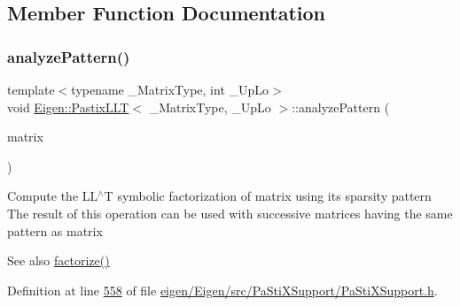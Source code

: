 \subsection{Member Function Documentation}
\mbox{\label{class_eigen_1_1_pastix_l_l_t_a671e8444ae2f04db3565e35caa958667}} 
\subsubsection{\texorpdfstring{analyze\+Pattern()}{analyzePattern()}\hspace{0.1cm}{\footnotesize\ttfamily [1/2]}}
{\footnotesize\ttfamily template$<$typename \+\_\+\+Matrix\+Type, int \+\_\+\+Up\+Lo$>$ \\
void \hyperlink{class_eigen_1_1_pastix_l_l_t}{Eigen\+::\+Pastix\+L\+LT}$<$ \+\_\+\+Matrix\+Type, \+\_\+\+Up\+Lo $>$\+::analyze\+Pattern (\begin{DoxyParamCaption}\item[{const Matrix\+Type \&}]{matrix }\end{DoxyParamCaption})\hspace{0.3cm}{\ttfamily [inline]}}

Compute the L\+L$^\wedge$T symbolic factorization of {\ttfamily matrix} using its sparsity pattern The result of this operation can be used with successive matrices having the same pattern as {\ttfamily matrix} \begin{DoxySeeAlso}{See also}
\hyperlink{class_eigen_1_1_pastix_l_l_t_a63dac317804b18a4704a519d7bdfaaff}{factorize()} 
\end{DoxySeeAlso}


Definition at line \hyperlink{eigen_2_eigen_2src_2_pa_sti_x_support_2_pa_sti_x_support_8h_source_l00558}{558} of file \hyperlink{eigen_2_eigen_2src_2_pa_sti_x_support_2_pa_sti_x_support_8h_source}{eigen/\+Eigen/src/\+Pa\+Sti\+X\+Support/\+Pa\+Sti\+X\+Support.\+h}.

\mbox{\label{class_eigen_1_1_pastix_l_l_t_a671e8444ae2f04db3565e35caa958667}} 
